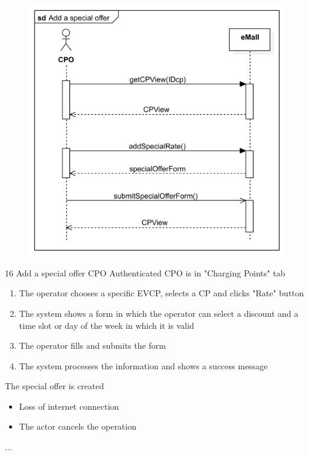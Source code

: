 \pagebreak
\usecase
{
    \begin{figure}[H]
        \centering
        \includegraphics[scale=0.9]{src/sequence_diagram/specialOffer.png}
    \end{figure}
}
{16}
{Add a special offer} %
{CPO} %
{Authenticated CPO is in "Charging Points" tab} %
{ %
    \begin{enumerate}
        \item The operator chooses a specific EVCP, selects a CP and clicks "Rate" button
        \item The system shows a form in which the operator can select a discount and a time slot or day of the week in which it is valid
        \item The operator fills and submits the form
        \item The system processes the information and shows a success message
    \end{enumerate}
}
{The special offer is created} %
{ %
    \begin{itemize}
        \item Loss of internet connection
        \item The actor cancels the operation
    \end{itemize}
}
{ %
    ...
}


